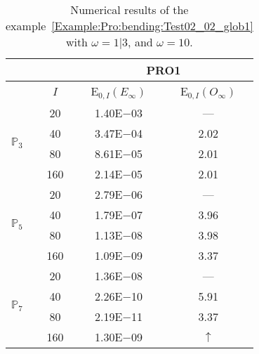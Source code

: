 \begin{table}[H]
\caption{Numerical results of the example~\ref{Example:Pro:bending:Test02_02_glob1} with $\omega=1|3$, and $\omega=10$.}
\setlength{\tabcolsep}{5pt}
\centering
\begin{tabular}{@{}l c c c@{}}
\toprule
 &  & \multicolumn{2}{c}{PRO1}\\
\midrule
 & $I$ & E$_{0,I}(E_{\infty})$ & E$_{0,I}(O_{\infty})$\\
\midrule
\multirow{4}{*}{$\mathbb{P}_{3}$} & 20 & 1.40E$-$03 & ---\\
 & 40 & 3.47E$-$04 & 2.02\\
 & 80 & 8.61E$-$05 & 2.01\\
 & 160 & 2.14E$-$05 & 2.01\\
\midrule
\multirow{4}{*}{$\mathbb{P}_{5}$} & 20 & 2.79E$-$06 & ---\\
 & 40 & 1.79E$-$07 & 3.96\\
 & 80 & 1.13E$-$08 & 3.98\\
 & 160 & 1.09E$-$09 & 3.37\\
\midrule
\multirow{4}{*}{$\mathbb{P}_{7}$} & 20 & 1.36E$-$08 & ---\\
 & 40 & 2.26E$-$10 & 5.91\\
 & 80 & 2.19E$-$11 & 3.37\\
 & 160 & 1.30E$-$09 & $\uparrow$\\
\bottomrule
\end{tabular}
\label{Table:PRO:test_02_02_test24}
\end{table}
